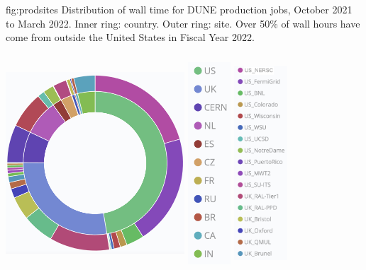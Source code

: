 \documentclass[../main-v1.tex]{subfiles}
\begin{document}
\begin{dunefigure}
{fig:prodsites}
{Distribution of wall time for DUNE production jobs, October 2021 to March 2022. Inner ring: country. Outer ring: site. Over 50\% of wall hours have come from outside the United States in Fiscal Year 2022.}
\includegraphics[height=3.5in,width=0.5\textwidth]{graphics/Workflow/walltimeplot.png}
\includegraphics[height=3.5in,width=0.12\textwidth]{graphics/Workflow/walltimecountry.png}
\includegraphics[height=3.5in,width=0.15\textwidth]{graphics/Workflow/walltimesite1.png}

\end{dunefigure}
\end{document}
